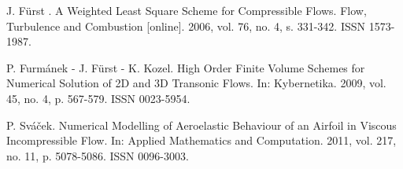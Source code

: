 
\begin{thebibliography}{10}

{\sc J. F{\"u}rst }. {A Weighted Least Square Scheme for Compressible Flows}. Flow, Turbulence and Combustion [online]. 2006, vol. 76, no. 4, s. 331-342.  ISSN 1573-1987.



{\sc P. Furm{\' a}nek - J. F{\" u}rst - K. Kozel}. {High Order Finite Volume Schemes for Numerical Solution of 2D and 3D Transonic Flows}. In: Kybernetika. 2009, vol. 45, no. 4, p. 567-579. ISSN 0023-5954.



{\sc P. Sv{\' a}{\v c}ek}. {Numerical Modelling of Aeroelastic Behaviour of an Airfoil in Viscous Incompressible Flow}. In: Applied Mathematics and Computation. 2011, vol. 217, no. 11, p. 5078-5086. ISSN 0096-3003.

\end{thebibliography}
